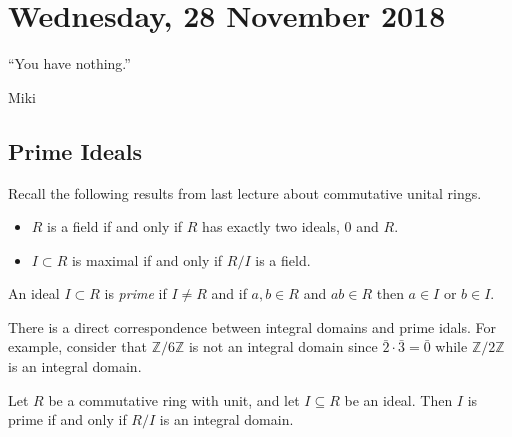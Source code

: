 \section{Wednesday, 28 November 2018}

\epigraph{``You have nothing.''}{Miki}

\subsection{Prime Ideals}

Recall the following results from last lecture about commutative unital rings.
\begin{itemize}
\item $R$ is a field if and only if $R$ has exactly two ideals, $0$ and $R$.
\item $I \subset R$ is maximal if and only if $R/I$ is a field.
\end{itemize}

\begin{definition}
An ideal $I \subset R$ is \emph{prime} if $I \not= R$  and if $a,b \in R$ and $ab \in R$ then $a \in I$ or $b \in I$.
\end{definition}

\begin{example}
\end{example}

There is a direct correspondence between integral domains and prime idals. For example, consider that $\mathbb{Z}/6\mathbb{Z}$ is not an integral domain since $\bar{2}\cdot\bar{3} = \bar{0}$ while $\mathbb{Z}/2\mathbb{Z}$ is an integral domain.

\begin{proposition}
Let $R$ be a commutative ring with unit, and let $I \subseteq R$ be an ideal. Then $I$ is prime if and only if $R/I$ is an integral domain.
\end{proposition}

